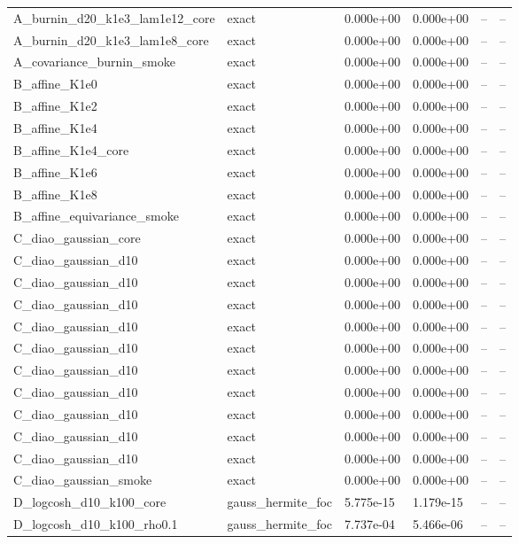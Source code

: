 \begin{tabular}{llllll}
A\_burnin\_d20\_k1e3\_lam1e12\_core & exact & 0.000e+00 & 0.000e+00 & -- & -- \\
A\_burnin\_d20\_k1e3\_lam1e8\_core & exact & 0.000e+00 & 0.000e+00 & -- & -- \\
A\_covariance\_burnin\_smoke & exact & 0.000e+00 & 0.000e+00 & -- & -- \\
B\_affine\_K1e0 & exact & 0.000e+00 & 0.000e+00 & -- & -- \\
B\_affine\_K1e2 & exact & 0.000e+00 & 0.000e+00 & -- & -- \\
B\_affine\_K1e4 & exact & 0.000e+00 & 0.000e+00 & -- & -- \\
B\_affine\_K1e4\_core & exact & 0.000e+00 & 0.000e+00 & -- & -- \\
B\_affine\_K1e6 & exact & 0.000e+00 & 0.000e+00 & -- & -- \\
B\_affine\_K1e8 & exact & 0.000e+00 & 0.000e+00 & -- & -- \\
B\_affine\_equivariance\_smoke & exact & 0.000e+00 & 0.000e+00 & -- & -- \\
C\_diao\_gaussian\_core & exact & 0.000e+00 & 0.000e+00 & -- & -- \\
C\_diao\_gaussian\_d10 & exact & 0.000e+00 & 0.000e+00 & -- & -- \\
C\_diao\_gaussian\_d10 & exact & 0.000e+00 & 0.000e+00 & -- & -- \\
C\_diao\_gaussian\_d10 & exact & 0.000e+00 & 0.000e+00 & -- & -- \\
C\_diao\_gaussian\_d10 & exact & 0.000e+00 & 0.000e+00 & -- & -- \\
C\_diao\_gaussian\_d10 & exact & 0.000e+00 & 0.000e+00 & -- & -- \\
C\_diao\_gaussian\_d10 & exact & 0.000e+00 & 0.000e+00 & -- & -- \\
C\_diao\_gaussian\_d10 & exact & 0.000e+00 & 0.000e+00 & -- & -- \\
C\_diao\_gaussian\_d10 & exact & 0.000e+00 & 0.000e+00 & -- & -- \\
C\_diao\_gaussian\_d10 & exact & 0.000e+00 & 0.000e+00 & -- & -- \\
C\_diao\_gaussian\_d10 & exact & 0.000e+00 & 0.000e+00 & -- & -- \\
C\_diao\_gaussian\_smoke & exact & 0.000e+00 & 0.000e+00 & -- & -- \\
D\_logcosh\_d10\_k100\_core & gauss\_hermite\_foc & 5.775e-15 & 1.179e-15 & -- & -- \\
D\_logcosh\_d10\_k100\_rho0.1 & gauss\_hermite\_foc & 7.737e-04 & 5.466e-06 & -- & -- \\

\end{tabular}
